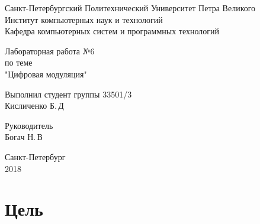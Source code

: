 \documentclass[12pt,a4paper]{scrartcl}
\begin{document}
\begin{titlepage}
  \begin{center}
    Санкт-Петербургский Политехнический Университет     Петра Великого \\
    
    Институт компьютерных наук и технологий \\
    
    Кафедра компьютерных систем и программных технологий
  \end{center}
  
  \vfill
  
  \begin{center}
  Лабораторная работа №6\\
  по теме\\
  "Цифровая модуляция"\\
\end{center}

\vfill

\newlength{\ML}
\hfill\begin{minipage}{0.4\textwidth}
  Выполнил студент группы 33501/3\\
  \underline{\hspace{\ML}} Кисличенко Б.\,Д\\
\end{minipage}%

\bigskip

\hfill\begin{minipage}{0.4\textwidth}
  Руководитель\\
  \underline{\hspace{\ML}} Богач Н.\,В\\
\end{minipage}%

\vfill
 
\begin{center}
  Санкт-Петербург\\
2018 
\end{center}

\end{titlepage}

\section{Цель}
\label{sec:goal}
\end{document}
